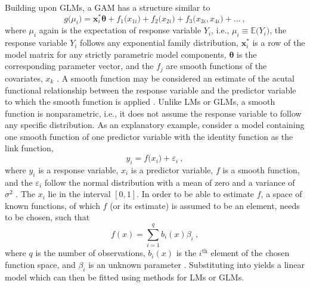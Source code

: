 Building upon GLMs, a GAM has a structure similar to
\begin{equation}
  \label{eq:GAM}
  g\bigl(\mu_i\bigr) = \symbf{x}_i^* \symbf{\theta} + f_{1}\bigl(x_{1i}\bigr) + f_{2}\bigl(x_{2i}\bigr) + f_{3}\bigl(x_{3i}, x_{4i}\bigr) + \ldots~,
\end{equation}
where \(\mu_i\) again is the expectation of response variable \(Y_i\), i.e., \(\mu_i \equiv \mathbb{E}\bigl(Y_i\bigr)\), the response variable \(Y_i\) follows any exponential family distribution, \(\symbf{x}_i^*\) is a row of the model matrix for any strictly parametric model components, \(\symbf{\theta}\) is the corresponding parameter vector, and the \(f_j\) are smooth functions of the covariates, \(x_k\) \parencite{Wood2006}.  A smooth function may be considered an estimate of the acutal functional relationship between the response variable and the predictor variable to which the smooth function is applied \parencite{Hastie1991}.  Unlike LMs or GLMs, a smooth function is nonparametric, i.e., it does not assume the response variable to follow any specific distribution.
As an explanatory example, consider a model containing one smooth function of one predictor variable with the identity function as the link function,
\begin{equation}
  \label{eq:GAMSimple}
  y_i = f\bigl(x_i\bigr) + \varepsilon_i~,
\end{equation}
where \(y_i\) is a response variable, \(x_i\) is a predictor variable, \(f\) is a smooth function, and the \(\varepsilon_i\) follow the normal distribution with a mean of zero and a variance of \(\sigma^2\) \parencite{Wood2006}.  The \(x_i\) lie in the interval \([0, 1]\).  In order to be able to estimate \(f\), a space of known functions, of which \(f\) (or its estimate) is assumed to be an element, needs to be chosen, such that
\begin{equation}
  \label{eq:SmoothFunctionBasis}
  f(x) = \sum_{i=1}^q b_i(x)\beta_i~,
\end{equation}
where \(q\) is the number of observations, \(b_i(x)\) is the \(i^{\text{th}}\) element of the chosen function space, and \(\beta_i\) is an unknown parameter \parencite{Wood2006}.  Substituting  into  yields a linear model which can then be fitted using methods for LMs or GLMs.

